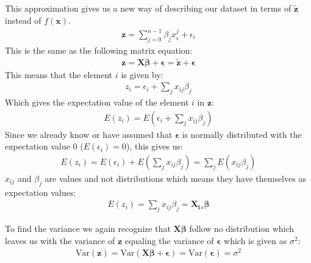 \documentclass[12pt]{article}
\begin{document}
This approximation gives us a new way of describing our dataset in terms of $\boldsymbol{\tilde{z}}$ instead of $f(\boldsymbol{x})$.
\begin{align*}
  \boldsymbol{z} = \sum_{j=0}^{n-1}\beta_jx_i^j + \epsilon_i
\end{align*}
This is the same as the following matrix equation:
\begin{align*}
  \boldsymbol{z} = \boldsymbol{X}\boldsymbol{\beta} + \boldsymbol{\epsilon} = \boldsymbol{\tilde{z}} + \boldsymbol{\epsilon}
\end{align*}
This means that the element $i$ is given by:
\begin{align*}
  z_i = \epsilon_i + \sum_j x_{ij}\beta_j
\end{align*}
Which gives the expectation value of the element $i$ in $\boldsymbol{z}$:
\begin{align*}
  E(z_i) = E(\epsilon_i + \sum_j x_{ij}\beta_j)
\end{align*}
Since we already know or have assumed that $\boldsymbol{\epsilon}$ is normally distributed with the expectation value 0 ($E(\epsilon_i)=0$), this gives us:
\begin{align*}
  E(z_i) = E(\epsilon_i) + E(\sum_j x_{ij}\beta_j) = \sum_jE(x_{ij}\beta_j)
\end{align*}
$x_{ij}$ and $\beta_j$ are values and not distributions which means they have themselves as expectation values:
\begin{align*}
    E(z_i) = \sum_jx_{ij}\beta_j = \boldsymbol{X_i}_*\boldsymbol{\beta}
\end{align*}

To find the variance we again recognize that $\boldsymbol{X}\boldsymbol{\beta}$ follow no distribution which leaves us with the variance of $\boldsymbol{z}$ equaling the variance of $\boldsymbol{\epsilon}$ which is given as $\sigma^2$:
\begin{align*}
  \text{Var}(\boldsymbol{z}) = \text{Var}(\boldsymbol{X}\boldsymbol{\beta} + \boldsymbol{\epsilon}) = \text{Var}(\boldsymbol{\epsilon}) = \sigma^2
\end{align*}
\end{document}
